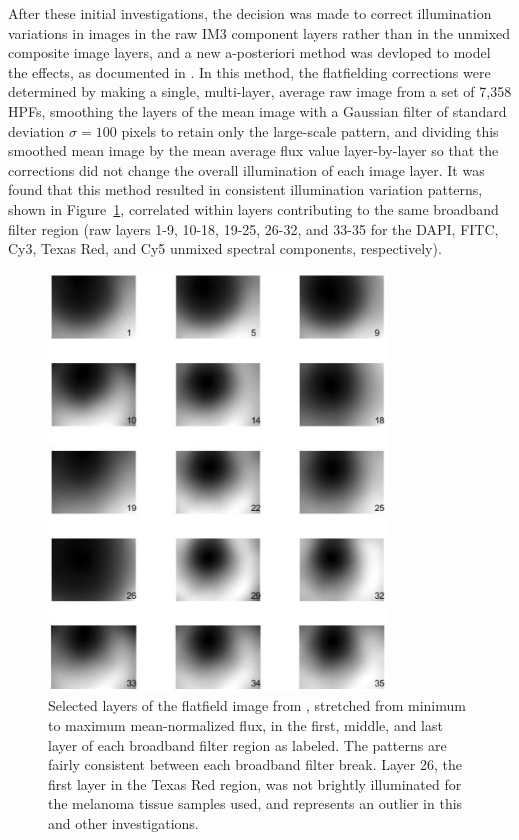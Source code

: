 \documentclass[letterpaper,11pt]{article}
\newcommand{\reffig}[1]{Figure~\ref{#1}}
\begin{document}
After these initial investigations, the decision was made to correct illumination variations in images in the raw IM3 component layers rather than in the unmixed composite image layers, and a new a-posteriori method was devloped to model the effects, as documented in \cite{Alex_flatfielding_2}. In this method, the flatfielding corrections were determined by making a single, multi-layer, average raw image from a set of 7,358 HPFs, smoothing the layers of the mean image with a Gaussian filter of standard deviation $\sigma=100$ pixels to retain only the large-scale pattern, and dividing this smoothed mean image by the mean average flux value layer-by-layer so that the corrections did not change the overall illumination of each image layer. It was found that this method resulted in consistent illumination variation patterns, shown in \reffig{fig:second_flatfielding}, correlated within layers contributing to the same broadband filter region (raw layers 1-9, 10-18, 19-25, 26-32, and 33-35 for the DAPI, FITC, Cy3, Texas Red, and Cy5 unmixed spectral components, respectively).

\begin{figure}[!ht]
\centering
\includegraphics[width=0.8\textwidth]{images/introduction/second_flatfield_image_layers}
\caption{\footnotesize Selected layers of the flatfield image from \cite{Alex_flatfielding_2}, stretched from minimum to maximum mean-normalized flux, in the first, middle, and last layer of each broadband filter region as labeled. The patterns are fairly consistent between each broadband filter break. Layer 26, the first layer in the Texas Red region, was not brightly illuminated for the melanoma tissue samples used, and represents an outlier in this and other investigations.}
\label{fig:second_flatfielding}
\end{figure}
\end{document}
